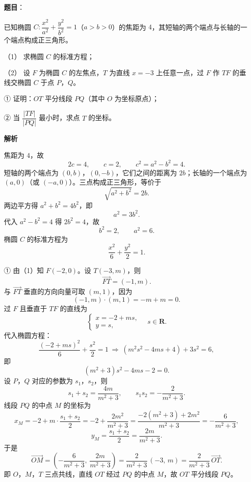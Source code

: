 \begin{answer}

\textbf{题目}：

已知椭圆 $C:\dfrac{x^2}{a^2}+\dfrac{y^2}{b^2}=1$（$a>b>0$）的焦距为 $4$，其短轴的两个端点与长轴的一个端点构成正三角形。

（1） 求椭圆 $C$ 的标准方程；

（2） 设 $F$ 为椭圆 $C$ 的左焦点，$T$ 为直线 $x=-3$ 上任意一点，过 $F$ 作 $TF$ 的垂线交椭圆 $C$ 于点 $P$，$Q$。

① 证明：$OT$ 平分线段 $PQ$（其中 $O$ 为坐标原点）；

② 当 $\dfrac{|TF|}{|PQ|}$ 最小时，求点 $T$ 的坐标。

\textbf{解析}


焦距为 $4$，故
\nopagebreak[4]
\[2c=4,\qquad c=2,\qquad c^2=a^2-b^2=4 .\]
短轴的两个端点为 $(0,b)$，$(0,-b)$，它们之间的距离为 $2b$；长轴的一个端点为 $(a,0)$（或 $(-a,0)$）。三点构成正三角形，等价于
\nopagebreak[4]
\[\sqrt{a^2+b^2}=2b .\]
两边平方得 $a^2+b^2=4b^2$，即
\nopagebreak[4]
\[a^2=3b^2 .\]
代入 $a^2-b^2=4$ 得 $2b^2=4$，故
\nopagebreak[4]
\[b^2=2,\qquad a^2=6 .\]
椭圆 $C$ 的标准方程为
\nopagebreak[4]
\[\frac{x^2}6+\frac{y^2}2=1 .\]


① 由（1）知 $F(-2,0)$。设 $T(-3,m)$，则
\nopagebreak[4]
\[\overrightarrow{FT}=(-1,m).\]
与 $\overrightarrow{FT}$ 垂直的方向向量可取 $(m,1)$，因为
\nopagebreak[4]
\[(-1,m)\cdot(m,1)=-m+m=0 .\]
过 $F$ 且垂直于 $TF$ 的直线为
\nopagebreak[4]
\[\begin{cases}x=-2+ms,\\y=s,\end{cases}\quad s\in\mathbf R .\]
代入椭圆方程：
\nopagebreak[4]
\[\frac{(-2+ms)^2}6+\frac{s^2}2=1
\ \Longrightarrow\ (m^2s^2-4ms+4)+3s^2=6,\]
即
\nopagebreak[4]
\[(m^2+3)s^2-4ms-2=0 .\]
设 $P$，$Q$ 对应的参数为 $s_1$，$s_2$，则
\nopagebreak[4]
\[s_1+s_2=\frac{4m}{m^2+3},\qquad s_1s_2=-\frac2{m^2+3}.\]
线段 $PQ$ 的中点 $M$ 的坐标为
\nopagebreak[4]
\[x_M=-2+m\cdot\frac{s_1+s_2}2=-2+\frac{2m^2}{m^2+3}
=\frac{-2(m^2+3)+2m^2}{m^2+3}=-\frac6{m^2+3},\]
\nopagebreak[4]
\[y_M=\frac{s_1+s_2}2=\frac{2m}{m^2+3}.\]
于是
\nopagebreak[4]
\[\overrightarrow{OM}=\left(-\frac6{m^2+3},\ \frac{2m}{m^2+3}\right)
=\frac{2}{m^2+3}\,(-3,\,m)=\frac{2}{m^2+3}\,\overrightarrow{OT} .\]
即 $O$，$M$，$T$ 三点共线，直线 $OT$ 经过 $PQ$ 的中点 $M$，故 $OT$ 平分线段 $PQ$。


\end{answer}
